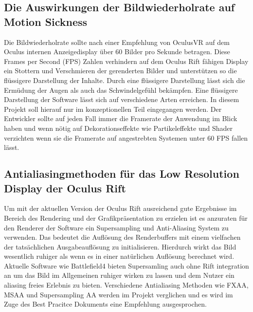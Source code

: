 \documentclass[pagesize, paper=a4, fontsize=12pt,titlepage=true, headings=small, headnosepline, abstractoff, liststotoc, nochapterprefix, plainheadsepline, twoside]{scrreprt}
\begin{document}
\subsection{Die Auswirkungen der Bildwiederholrate auf Motion Sickness}
Die Bildwiederholrate sollte nach einer Empfehlung von OculusVR auf dem Oculus internen Anzeigedisplay über 60 Bilder pro Sekunde betragen. Diese Frames per Second (FPS) Zahlen verhindern auf dem Oculus Rift fähigen Display ein Stottern und Verschmieren der gerenderten Bilder und unterstützen so die flüssigere Darstellung der Inhalte. Durch eine flüssigere Darstellung lässt sich die Ermüdung der Augen als auch das Schwindelgefühl bekämpfen. Eine flüssigere Darstellung der Software lässt sich auf verschiedene Arten erreichen. In diesem Projekt soll hierauf nur im konzeptionellen Teil eingegangen werden. Der Entwickler sollte auf jeden Fall immer die Framerate der Anwendung im Blick haben und wenn nötig auf Dekorationseffekte wie Partikeleffekte und Shader verzichten wenn sie die Framerate auf angestrebten Systemen unter 60 FPS fallen lässt.

\subsection{Antialiasingmethoden für das Low Resolution Display der Oculus Rift}
Um mit der aktuellen Version der Oculus Rift ausreichend gute Ergebnisse im Bereich des Rendering und der Grafikpräsentation zu erzielen ist es anzuraten für den Renderer der Software ein Supersampling und Anti-Aliasing System zu verwenden. Das bedeutet die Auflösung des Renderbuffers mit einem vielfachen der tatsächlichen Ausgabeauflösung zu initialisieren. Hierdurch wirkt das Bild wesentlich ruhiger als wenn es in einer natürlichen Auflösung berechnet wird. Aktuelle Software wie Battlefield4 \cite{Battlefield42014} bieten Supersamling auch ohne Rift integration an um das Bild im Allgemeinen ruhiger wirken zu lassen und dem Nutzer ein aliasing freies Erlebnis zu bieten. Verschiedene Antialiasing Methoden wie FXAA, MSAA und Supersampling AA werden im Projekt verglichen und es wird im Zuge des Best Pracitce Dokuments eine Empfehlung ausgesprochen.
\end{document}
